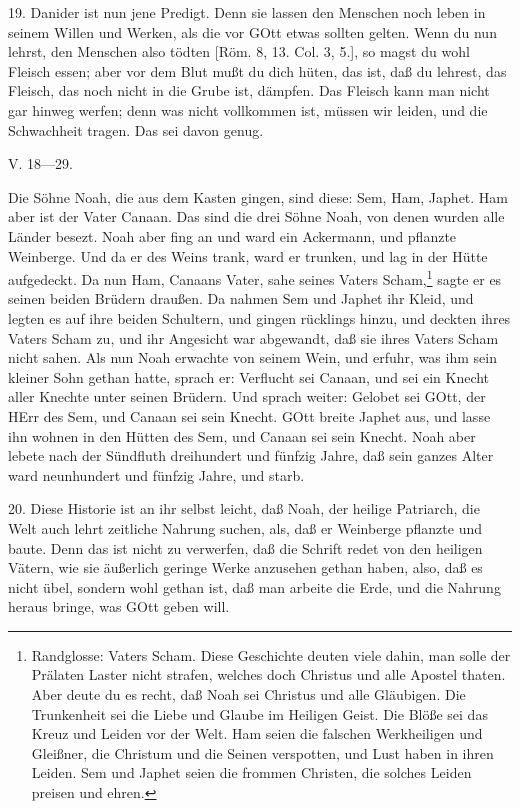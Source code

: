 19. Danider ist nun jene Predigt. Denn sie lassen den Menschen noch leben in seinem Willen und Werken, als die vor GOtt etwas sollten gelten. Wenn du nun lehrst, den Menschen also tödten [Röm. 8, 13. Col. 3, 5.], so magst du wohl Fleisch essen; aber vor dem Blut mußt du dich hüten, das ist, daß du lehrest, das Fleisch, das noch nicht in die Grube ist, dämpfen. Das Fleisch kann man nicht gar hinweg werfen; denn was nicht vollkommen ist, müssen wir leiden, und die Schwachheit tragen. Das sei davon genug.

\begin{schriftzitat}
V. 18—29.

Die Söhne Noah, die aus dem Kasten gingen, sind diese: Sem, Ham, Japhet. Ham aber ist der Vater Canaan. Das sind die drei Söhne Noah, von denen wurden alle Länder besezt. Noah aber fing an und ward ein Ackermann, und pflanzte Weinberge. Und da er des Weins trank, ward er trunken, und lag in der Hütte aufgedeckt. Da nun Ham, Canaans Vater, sahe seines Vaters Scham,\footnote{Randglosse: Vaters Scham. Diese Geschichte deuten viele dahin, man solle der Prälaten Laster nicht strafen, welches doch Christus und alle Apostel thaten. Aber deute du es recht, daß Noah sei Christus und alle Gläubigen. Die Trunkenheit sei die Liebe und Glaube im Heiligen Geist. Die Blöße sei das Kreuz und Leiden vor der Welt. Ham seien die falschen Werkheiligen und Gleißner, die Christum und die Seinen verspotten, und Lust haben in ihren Leiden. Sem und Japhet seien die frommen Christen, die solches Leiden preisen und ehren.} sagte er es seinen beiden Brüdern draußen. Da nahmen Sem und Japhet ihr Kleid, und legten es auf ihre beiden Schultern, und gingen rücklings hinzu, und deckten ihres Vaters Scham zu, und ihr Angesicht war abgewandt, daß sie ihres Vaters Scham nicht sahen. Als nun Noah erwachte von seinem Wein, und erfuhr, was ihm sein kleiner Sohn gethan hatte, sprach er: Verflucht sei Canaan, und sei ein Knecht aller Knechte unter seinen Brüdern. Und sprach weiter: Gelobet sei GOtt, der HErr des Sem, und Canaan sei sein Knecht. GOtt breite Japhet aus, und lasse ihn wohnen in den Hütten des Sem, und Canaan sei sein Knecht. Noah aber lebete nach der Sündfluth dreihundert und fünfzig Jahre, daß sein ganzes Alter ward neunhundert und fünfzig Jahre, und starb.
\end{schriftzitat}

20. Diese Historie ist an ihr selbst leicht, daß Noah, der heilige Patriarch, die Welt auch lehrt zeitliche Nahrung suchen, als, daß er Weinberge pflanzte und baute. Denn das ist nicht zu verwerfen, daß die Schrift redet von den heiligen Vätern, wie sie äußerlich geringe Werke anzusehen
gethan haben, also, daß es nicht übel, sondern wohl gethan ist, daß man arbeite die Erde, und die Nahrung heraus bringe, was GOtt geben will.

